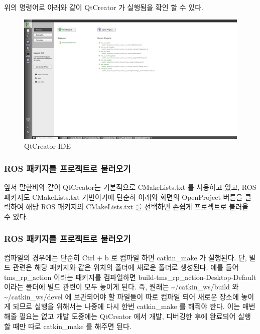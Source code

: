 \noindent
위의 명령어로 아래와 같이 QtCreator 가 실행됨을 확인 할 수 있다.

\begin{figure}[h]
\centering\includegraphics[width=0.9\columnwidth]{pictures/chapter2/qtcreator1.png}
\caption{QtCreator IDE}
\end{figure}

\subsubsection{ROS 패키지를 프로젝트로 불러오기}
앞서 말한바와 같이 QtCreator는 기본적으로 CMakeLists.txt 를 사용하고 있고, ROS 패키지도 CMakeLists.txt 기반이기에 단순히 아래와 화면의 OpenProject 버튼을 클릭하여 해당 ROS 패키지의 CMakeLists.txt 를 선택하면 손쉽게 프로젝트로 불러올 수 있다.

\subsubsection{ROS 패키지를 프로젝트로 불러오기}
컴파일의 경우에는 단순히 Ctrl + b 로 컴파일 하면 catkin\_make 가 실행된다. 단, 빌드 관련은 해당 패키지와 같은 위치의 폴더에 새로운 폴더로 생성된다. 예를 들어 tms\_rp\_action 이라는 패키지를 컴파일하면 build-tms\_rp\_action-Desktop-Default 이라는 폴더에 빌드 관련이 모두 놓이게 된다. 즉,  원래는 \textasciitilde/catkin\_ws/build 와 \textasciitilde/catkin\_ws/devel 에 보관되어야 할 파일들이 따로 컴파일 되어 새로운 장소에 놓이게 되므로 실행을 위해서는 나중에 다시 한번 catkin\_make 를 해줘야 한다. 이는 매번 해줄 필요는 없고 개발 도중에는 QtCreator 에서 개발, 디버깅한 후에 완료되어 실행할 때만 따로 catkin\_make 를 해주면 된다. 

